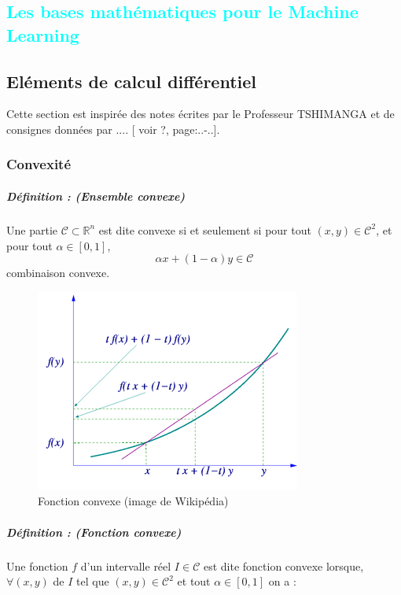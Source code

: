 \textcolor{cyan}{\chapter{Les bases mathématiques pour le Machine Learning}}
\section{Eléments de calcul différentiel}
	Cette section est inspirée des notes écrites par le Professeur TSHIMANGA \cite[voir][page:45-82]{jtshiman:2021} et de consignes données
	par .... [ voir ?, page:..-..].
	\subsection{Convexité}
	\paragraph*{Définition : (Ensemble convexe)}
	Une partie $\mathcal{C} \subset \mathbb{R}^n $ est dite convexe si et seulement si pour tout $(x,y) \in \mathcal{C}^2$,
	et pour tout $ \alpha \in [0, 1]$,
	$$ \alpha x + (1 - \alpha)y \in \mathcal{C}$$ combinaison convexe.
	\begin{figure}
	\centering
	\includegraphics{images/convex_function_graph.png}
	\caption{Fonction convexe (image de Wikipédia)}
	\label{convexe_graph}
	\end{figure}
	\paragraph*{Définition : (Fonction convexe)}
	Une fonction $f$ d'un intervalle réel $I \in \mathcal{C}$ est dite fonction convexe lorsque, $\forall (x,y)$ de $I$ tel que $(x,y) \in \mathcal{C}^2$ et tout $\alpha \in [0, 1]$ on a :
	
	
